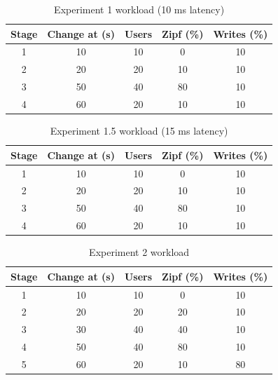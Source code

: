 \documentclass[twocolumn]{article}
\begin{document}
\begin{table}[t]
    \centering
    \caption{Experiment 1 workload (10 ms latency)}
    \label{tab:workload-exp1}
    \scriptsize
    \setlength{\tabcolsep}{3pt}
    \renewcommand{\arraystretch}{1.15}
    \begin{tabular*}{\columnwidth}{@{\extracolsep{\fill}}ccccc@{}}
        \toprule
        Stage & Change at (s) & Users & Zipf (\%) & Writes (\%) \\
        \midrule
        1 & 10 & 10 & 0 & 10 \\
        2 & 20 & 20 & 10 & 10 \\
        3 & 50 & 40 & 80 & 10 \\
        4 & 60 & 20 & 10 & 10 \\
        \bottomrule
    \end{tabular*}
\end{table}

\begin{table}[t]
    \centering
    \caption{Experiment 1.5 workload (15 ms latency)}
    \label{tab:workload-exp1-5}
    \scriptsize
    \setlength{\tabcolsep}{3pt}
    \renewcommand{\arraystretch}{1.15}
    \begin{tabular*}{\columnwidth}{@{\extracolsep{\fill}}ccccc@{}}
        \toprule
        Stage & Change at (s) & Users & Zipf (\%) & Writes (\%) \\
        \midrule
        1 & 10 & 10 & 0 & 10 \\
        2 & 20 & 20 & 10 & 10 \\
        3 & 50 & 40 & 80 & 10 \\
        4 & 60 & 20 & 10 & 10 \\
        \bottomrule
    \end{tabular*}
\end{table}

\begin{table}[t]
    \centering
    \caption{Experiment 2 workload}
    \label{tab:workload-exp2}
    \scriptsize
    \setlength{\tabcolsep}{3pt}
    \renewcommand{\arraystretch}{1.15}
    \begin{tabular*}{\columnwidth}{@{\extracolsep{\fill}}ccccc@{}}
        \toprule
        Stage & Change at (s) & Users & Zipf (\%) & Writes (\%) \\
        \midrule
        1 & 10 & 10 & 0 & 10 \\
        2 & 20 & 20 & 20 & 10 \\
        3 & 30 & 40 & 40 & 10 \\
        4 & 50 & 40 & 80 & 10 \\
        5 & 60 & 20 & 10 & 80 \\
        \bottomrule
    \end{tabular*}
\end{table}
\end{document}
